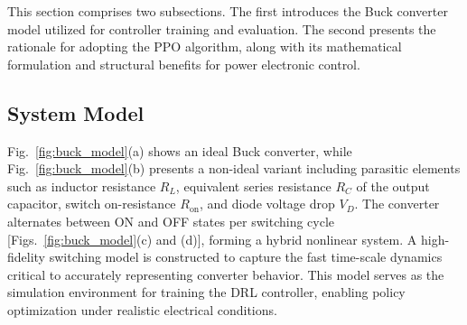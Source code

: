 \documentclass[conference]{IEEEtran}
\begin{document}
This section comprises two subsections. The first introduces the Buck converter model utilized for controller training and evaluation. The second presents the rationale for adopting the PPO algorithm, along with its mathematical formulation and structural benefits for power electronic control.

\subsection{System Model}

Fig.~\ref{fig:buck_model}(a) shows an ideal Buck converter, while Fig.~\ref{fig:buck_model}(b) presents a non-ideal variant including parasitic elements such as inductor resistance $R_L$, equivalent series resistance $R_C$ of the output capacitor, switch on-resistance $R_{\text{on}}$, and diode voltage drop $V_D$. The converter alternates between ON and OFF states per switching cycle [Figs.~\ref{fig:buck_model}(c) and (d)], forming a hybrid nonlinear system. A high-fidelity switching model is constructed to capture the fast time-scale dynamics critical to accurately representing converter behavior. This model serves as the simulation environment for training the DRL controller, enabling policy optimization under realistic electrical conditions.







\end{document}
